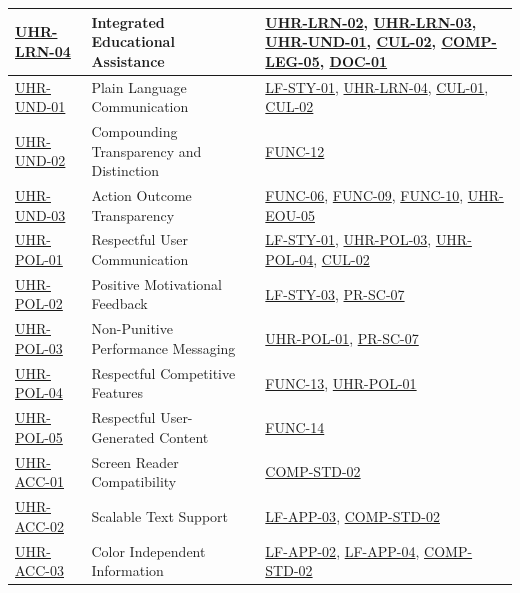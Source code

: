 \documentclass[12pt]{article}
\begin{document}
\begin{xltabular}{\textwidth}{|p{2.3cm}|p{4.2cm}|X|}
\hline
\hyperlink{req:UHR-LRN-04}{UHR-LRN-04} & Integrated Educational Assistance & \hyperlink{req:UHR-LRN-02}{UHR-LRN-02}, \hyperlink{req:UHR-LRN-03}{UHR-LRN-03}, \hyperlink{req:UHR-UND-01}{UHR-UND-01}, \hyperlink{req:CUL-02}{CUL-02}, \hyperlink{req:COMP-LEG-05}{COMP-LEG-05}, \hyperlink{req:DOC-01}{DOC-01} \\
\hline
\hyperlink{req:UHR-UND-01}{UHR-UND-01} & Plain Language Communication & \hyperlink{req:LF-STY-01}{LF-STY-01}, \hyperlink{req:UHR-LRN-04}{UHR-LRN-04}, \hyperlink{req:CUL-01}{CUL-01}, \hyperlink{req:CUL-02}{CUL-02} \\
\hline
\hyperlink{req:UHR-UND-02}{UHR-UND-02} & Compounding Transparency and Distinction & \hyperlink{req:FUNC-12}{FUNC-12} \\
\hline
\hyperlink{req:UHR-UND-03}{UHR-UND-03} & Action Outcome Transparency & \hyperlink{req:FUNC-06}{FUNC-06}, \hyperlink{req:FUNC-09}{FUNC-09}, \hyperlink{req:FUNC-10}{FUNC-10}, \hyperlink{req:UHR-EOU-05}{UHR-EOU-05} \\
\hline
\hyperlink{req:UHR-POL-01}{UHR-POL-01} & Respectful User Communication & \hyperlink{req:LF-STY-01}{LF-STY-01}, \hyperlink{req:UHR-POL-03}{UHR-POL-03}, \hyperlink{req:UHR-POL-04}{UHR-POL-04}, \hyperlink{req:CUL-02}{CUL-02} \\
\hline
\hyperlink{req:UHR-POL-02}{UHR-POL-02} & Positive Motivational Feedback & \hyperlink{req:LF-STY-03}{LF-STY-03}, \hyperlink{req:PR-SC-07}{PR-SC-07} \\
\hline
\hyperlink{req:UHR-POL-03}{UHR-POL-03} & Non-Punitive Performance Messaging & \hyperlink{req:UHR-POL-01}{UHR-POL-01}, \hyperlink{req:PR-SC-07}{PR-SC-07} \\
\hline
\hyperlink{req:UHR-POL-04}{UHR-POL-04} & Respectful Competitive Features & \hyperlink{req:FUNC-13}{FUNC-13}, \hyperlink{req:UHR-POL-01}{UHR-POL-01} \\
\hline
\hyperlink{req:UHR-POL-05}{UHR-POL-05} & Respectful User-Generated Content & \hyperlink{req:FUNC-14}{FUNC-14} \\
\hline
\hyperlink{req:UHR-ACC-01}{UHR-ACC-01} & Screen Reader Compatibility & \hyperlink{req:COMP-STD-02}{COMP-STD-02} \\
\hline
\hyperlink{req:UHR-ACC-02}{UHR-ACC-02} & Scalable Text Support & \hyperlink{req:LF-APP-03}{LF-APP-03}, \hyperlink{req:COMP-STD-02}{COMP-STD-02} \\
\hline
\hyperlink{req:UHR-ACC-03}{UHR-ACC-03} & Color Independent Information & \hyperlink{req:LF-APP-02}{LF-APP-02}, \hyperlink{req:LF-APP-04}{LF-APP-04}, \hyperlink{req:COMP-STD-02}{COMP-STD-02} \\

\end{xltabular}
\end{document}
